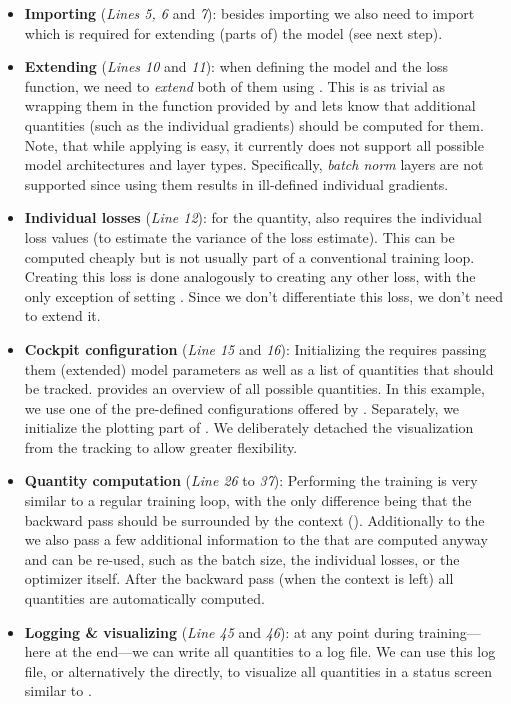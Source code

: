 \begin{itemize}
\item \textbf{Importing} (\textit{Lines 5, 6} and \textit{7}): besides importing
  \cockpit we also need to import \backpack which is required for extending
  (parts of) the model (see next step).
\item \textbf{Extending} (\textit{Lines 10} and \textit{11}): when defining the
  model and the loss function, we need to \emph{extend} both of them using
  \backpack. This is as trivial as wrapping them in the 
  function provided by \backpack and lets \backpack know that additional
  quantities (such as the individual gradients) should be computed for them.
  Note, that while applying \backpack is easy, it currently does not support all
  possible model architectures and layer types. Specifically, \emph{batch norm}
  layers are not supported since using them results in ill-defined individual
  gradients.
\item \textbf{Individual losses} (\textit{Line 12}): for the 
  quantity, \cockpit also requires the individual loss values (to estimate the
  variance of the loss estimate). This can be computed cheaply but is not
  usually part of a conventional training loop. Creating this loss is done
  analogously to creating any other loss, with the only exception of setting
  . Since we don't differentiate this loss, we don't
  need to extend it.
\item \textbf{Cockpit configuration} (\textit{Line 15} and \textit{16}):
  Initializing the \cockpit requires passing them (extended) model parameters as
  well as a list of quantities that should be tracked.
   provides an overview of all possible
  quantities. In this example, we use one of the pre-defined configurations
  offered by \cockpit. Separately, we initialize the plotting part of \cockpit.
  We deliberately detached the visualization from the tracking to allow greater
  flexibility.
\item \textbf{Quantity computation} (\textit{Line 26} to \textit{37}):
  Performing the training is very similar to a regular training loop, with the
  only difference being that the backward pass should be surrounded by the
  \cockpit context (). Additionally to the
   we also pass a few additional information to the
  \cockpit that are computed anyway and can be re-used, such as the batch size,
  the individual losses, or the optimizer itself. After the backward pass (when
  the context is left) all \cockpit quantities are automatically computed.
\item \textbf{Logging \& visualizing} (\textit{Line 45} and \textit{46}): at any
  point during training---here at the end---we can write all quantities to a log
  file. We can use this log file, or alternatively the \cockpit directly, to
  visualize all quantities in a status screen similar to
  .
\end{itemize}

